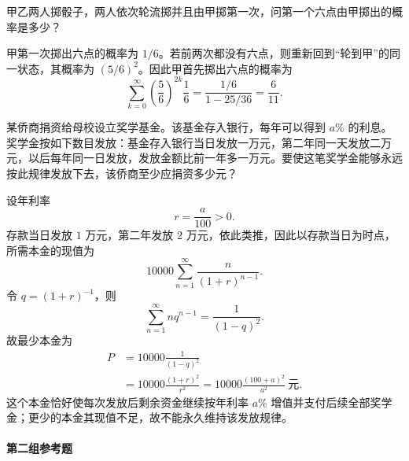 \begin{xreferenceproblem}[15]
甲乙两人掷骰子，两人依次轮流掷并且由甲掷第一次，问第一个六点由甲掷出的概率是多少？
\end{xreferenceproblem}
\begin{xsolution}
甲第一次掷出六点的概率为 $1/6$。若前两次都没有六点，则重新回到“轮到甲”的同一状态，其概率为 $(5/6)^2$。因此甲首先掷出六点的概率为
\[
  \sum_{k=0}^{\infty}
  \left(\frac56\right)^{2k}\frac16
  =\frac{1/6}{1-25/36}
  =\boxed{\frac6{11}}.
\]
\end{xsolution}


\begin{xreferenceproblem}[16]
某侨商捐资给母校设立奖学基金。该基金存入银行，每年可以得到 $a\%$ 的利息。奖学金按如下数目发放：基金存入银行当日发放一万元，第二年同一天发放二万元，以后每年同一日发放，发放金额比前一年多一万元。要使这笔奖学金能够永远按此规律发放下去，该侨商至少应捐资多少元？
\end{xreferenceproblem}
\begin{xsolution}
设年利率
\[
  r=\frac a{100}>0.
\]
存款当日发放 $1$ 万元，第二年发放 $2$ 万元，依此类推，因此以存款当日为时点，所需本金的现值为
\[
  10000\sum_{n=1}^{\infty}\frac{n}{(1+r)^{n-1}}.
\]
令 $q=(1+r)^{-1}$，则
\[
  \sum_{n=1}^{\infty}nq^{n-1}=\frac1{(1-q)^2}.
\]
故最少本金为
\[
\begin{aligned}
  P
  &=10000\frac1{(1-q)^2}\\
  &=10000\frac{(1+r)^2}{r^2}
  =\boxed{10000\frac{(100+a)^2}{a^2}\ \text{元}}.
\end{aligned}
\]
这个本金恰好使每次发放后剩余资金继续按年利率 $a\%$ 增值并支付后续全部奖学金；更少的本金其现值不足，故不能永久维持该发放规律。
\end{xsolution}


\paragraph{第二组参考题}

